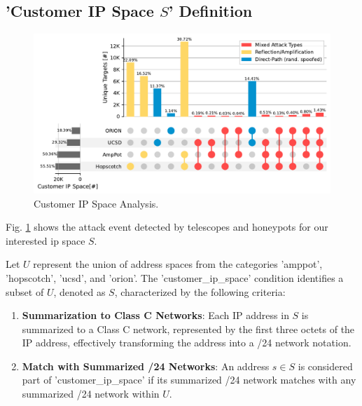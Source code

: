 \subsection*{'Customer IP Space $S$' Definition}
\begin{figure}[htbp]
    \centering
    \includegraphics[scale=0.4]{graphs/space_no_event.pdf}
    \caption{Customer IP Space Analysis.}
    \label{fig:customeripspace}
\end{figure}
Fig. \ref{fig:customeripspace} shows the attack event detected by telescopes and honeypots for our interested ip space $S$.
    
Let $U$ represent the union of address spaces from the categories 'amppot', 'hopscotch', 'ucsd', and 'orion'. The 'customer\_ip\_space' condition identifies a subset of $U$, denoted as $S$, characterized by the following criteria:
\begin{enumerate}
    \item \textbf{Summarization to Class C Networks}: Each IP address in $S$ is summarized to a Class C network, represented by the first three octets of the IP address, effectively transforming the address into a /24 network notation.
    \item \textbf{Match with Summarized /24 Networks}: An address $s \in S$ is considered part of 'customer\_ip\_space' if its summarized /24 network matches with any summarized /24 network within $U$.
\end{enumerate}

